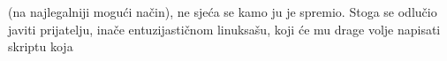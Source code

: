 \documentclass{exam}
\begin{document}
                                                                                            (na
                                                                                            najlegalniji
                                                                                            mogući
                                                                                            način),
                                                                                            ne
                                                                                            sjeća
                                                                                            se
                                                                                            kamo
                                                                                            ju
                                                                                            je
                                                                                            spremio.
                                                                                            Stoga
                                                                                            se
                                                                                            odlučio
                                                                                            javiti
                                                                                            prijatelju,
                                                                                            inače
                                                                                            entuzijastičnom
                                                                                            linuksašu,
                                                                                            koji
                                                                                            će
                                                                                            mu
                                                                                            drage
                                                                                            volje
                                                                                            napisati
                                                                                            skriptu
                                                                                            koja
\end{document}
